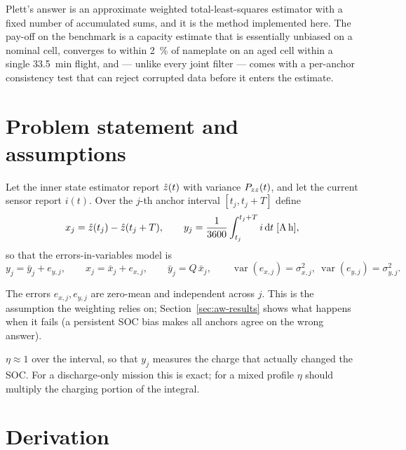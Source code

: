 Plett's answer is an approximate weighted total-least-squares estimator with a fixed number of
accumulated sums, and it is the method implemented here.  The pay-off on the benchmark is a capacity
estimate that is essentially unbiased on a nominal cell, converges to within
\SI{2}{\percent} of nameplate on an aged cell within a single \SI{33.5}{\minute} flight, and ---
unlike every joint filter --- comes with a per-anchor consistency test that can reject corrupted
data before it enters the estimate.

\section{Problem statement and assumptions}
Let the inner state estimator report $\hat{z}(t)$ with variance $P_{zz}(t)$, and let the
current sensor report $i(t)$.  Over the $j$-th anchor interval $[t_j,t_j+T]$ define
\begin{equation}
x_j=\hat{z}(t_j)-\hat{z}(t_j+T),\qquad
y_j=\frac{1}{3600}\int_{t_j}^{t_j+T} i\,\mathrm{d}t \;[\si{\ampere\hour}] ,
\label{eq:aw-xy}
\end{equation}
so that the errors-in-variables model is
\begin{equation}
y_j=\bar y_j+e_{y,j},\qquad x_j=\bar x_j+e_{x,j},\qquad \bar y_j=Q\,\bar x_j,
\qquad \operatorname{var}(e_{x,j})=\sigma_{x,j}^2,\ \operatorname{var}(e_{y,j})=\sigma_{y,j}^2 .
\label{eq:aw-eiv}
\end{equation}

\begin{assumption}\label{as:aw-indep}
The errors $e_{x,j},e_{y,j}$ are zero-mean and independent across $j$.  This is the assumption the
weighting relies on; Section~\ref{sec:aw-results} shows what happens when it fails (a persistent
SOC bias makes all anchors agree on the wrong answer).
\end{assumption}

\begin{assumption}\label{as:aw-eta}
$\eta\approx1$ over the interval, so that $y_j$ measures the charge that actually changed the SOC.
For a discharge-only mission this is exact; for a mixed profile $\eta$ should multiply the charging
portion of the integral.
\end{assumption}

\section{Derivation}


